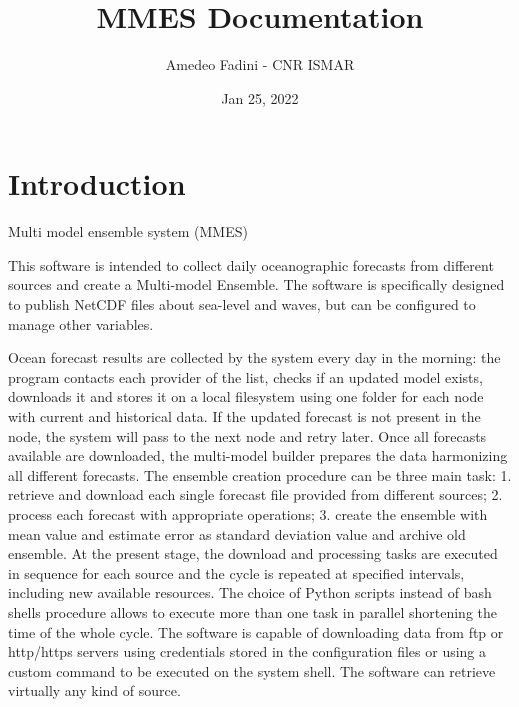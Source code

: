 \documentclass[letterpaper,10pt,english]{sphinxmanual}
\title{MMES Documentation}
\date{Jan 25, 2022}
\author{Amedeo Fadini - CNR ISMAR}
\begin{document}
\pagestyle{empty}
\sphinxmaketitle
\pagestyle{plain}
\sphinxtableofcontents
\pagestyle{normal}
\label{\detokenize{index::doc}}



\chapter{Introduction}
\label{\detokenize{introduction:introduction}}\label{\detokenize{introduction:id1}}\label{\detokenize{introduction::doc}}
Multi model ensemble system (MMES)

This software is intended to collect daily oceanographic forecasts from different sources and create a Multi-model Ensemble. The software is specifically designed to publish NetCDF files about sea-level and waves, but can be configured to manage other variables.
\begin{quote}

\begin{figure}[H]
\centering

\noindent{}
\end{figure}
\end{quote}

Ocean forecast results are collected by the system every day in the morning: the program contacts each provider of the list, checks if an updated model exists, downloads it and stores it on a local filesystem using one folder for each node with current and historical data. If the updated forecast is not present in the node, the system will pass to the next node and retry later. Once all forecasts available are downloaded, the multi-model builder prepares the data harmonizing all different forecasts. The ensemble creation procedure can be three main task:
1. retrieve and download each single forecast file provided from different sources;
2. process each forecast with appropriate operations;
3. create the ensemble with mean value and estimate error as standard deviation value and archive old ensemble.
At the present stage, the download and processing tasks are executed in sequence for each source and the cycle is repeated at specified intervals, including new available resources. The choice of Python scripts instead of bash shells procedure allows to execute more than one task in parallel shortening the time of the whole cycle. The software is capable of downloading data from ftp or http/https servers using credentials stored in the configuration files or using a custom command to be executed on the system shell. The software can retrieve virtually any kind of source.
\end{document}
